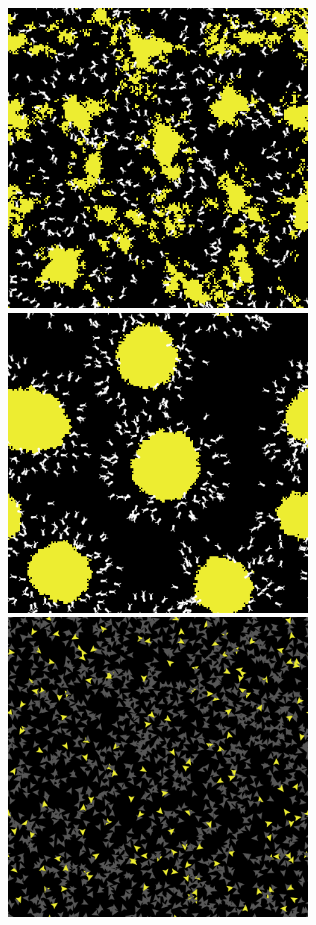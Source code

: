\documentclass{article}
\begin{document}
\begin{enumerate}
\includegraphics[width=300px]{Termites2.png}\\
\includegraphics[width=300px]{Termites3.png}\\
\includegraphics[width=300px]{Fireflies1.png}\\

\end{enumerate}
\end{document}
